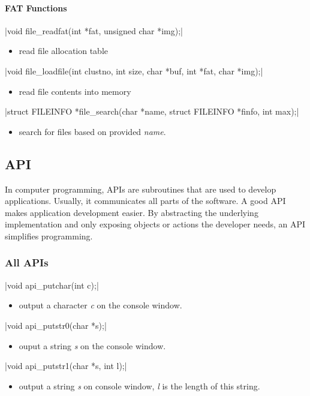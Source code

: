 \documentclass{swfcthesis}
\begin{document}
\paragraph{FAT Functions}

\csingle|void file_readfat(int *fat, unsigned char *img);|
\begin{itemize}
\item read file allocation table
\end{itemize}

\csingle|void file_loadfile(int clustno, int size, char *buf, int *fat, char *img);|
\begin{itemize}
\item read file contents into memory
\end{itemize}

\csingle|struct FILEINFO *file_search(char *name, struct FILEINFO *finfo, int max);|
\begin{itemize}
\item search for files based on provided \emph{name}.
\end{itemize}

\subsection{API}
\label{sec:api}
In computer programming, APIs are subroutines that are used to develop
applications. Usually, it communicates all parts of the software. A good API makes
application development easier. By abstracting the underlying implementation and only
exposing objects or actions the developer needs, an API simplifies programming.

\subsubsection{All APIs}
\label{sec:all-apis}

\csingle|void api_putchar(int c);|
\begin{itemize}
\item output a character \emph{c} on the console window.
\end{itemize}

\csingle|void api_putstr0(char *s);|
\begin{itemize}
\item ouput a string \emph{s} on the console window.
\end{itemize}

\csingle|void api_putstr1(char *s, int l);|
\begin{itemize}
\item output a string \emph{s} on console window, \emph{l} is the length of this string.
\end{itemize}
\end{document}
